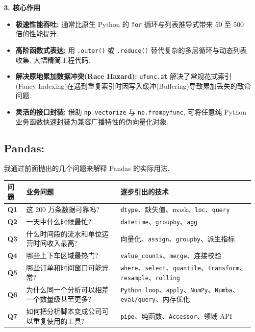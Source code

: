 \documentclass[11pt]{article}
\providecommand{\tightlist}{%
      \setlength{\itemsep}{0pt}\setlength{\parskip}{0pt}}
\begin{document}
\textbf{3. 核心作用}

\begin{itemize}
\tightlist
\item
  \textbf{极速性能吞吐:} 通常比原生 Python 的 \texttt{for}
  循环与列表推导式带来 50 至 500 倍的性能提升.
\item
  \textbf{高阶函数式表达:} 用 \texttt{.outer()} 或 \texttt{.reduce()}
  替代复杂的多层循环与动态列表收集, 大幅精简工程代码.
\item
  \textbf{解决原地累加数据冲突(Race Hazard):} \texttt{ufunc.at}
  解决了常规花式索引(Fancy
  Indexing)在遇到重复索引时因写入缓冲(Buffering)导致累加丢失的致命问题.
\item
  \textbf{灵活的接口封装:} 借助 \texttt{np.vectorize} 与
  \texttt{np.frompyfunc}, 可将任意纯 Python
  业务函数快速封装为兼容广播特性的伪向量化对象.
\end{itemize}

    \subsection{Pandas:}\label{pandas}

    我通过前面抛出的几个问题来解释 Pandas 的实际用法.

{\def\LTcaptype{none} %
\begin{longtable}[]{@{}
  >{\centering\arraybackslash}p{}
  >{\centering\arraybackslash}p{}
  >{\centering\arraybackslash}p{}@{}}
\toprule\noalign{}
\begin{minipage}[b]{\linewidth}\centering
问题
\end{minipage} & \begin{minipage}[b]{\linewidth}\centering
业务问题
\end{minipage} & \begin{minipage}[b]{\linewidth}\centering
逐步引出的技术
\end{minipage} \\
\midrule\noalign{}
\endhead
\bottomrule\noalign{}
\endlastfoot
\textbf{Q1} & 这 200 万条数据可靠吗? &
\texttt{dtype}、缺失值、mask、\texttt{loc}、\texttt{query} \\
\textbf{Q2} & 一天中什么时候最忙? &
\texttt{datetime}、\texttt{groupby}、\texttt{agg} \\
\textbf{Q3} & 什么时间段的流水和单位运营时间收入最高? &
向量化、\texttt{assign}、\texttt{groupby}、派生指标 \\
\textbf{Q4} & 哪些上下车区域最热门? &
\texttt{value\_counts}、\texttt{merge}、连接校验 \\
\textbf{Q5} & 哪些订单和时间窗口可能异常? &
\texttt{where}、\texttt{select}、\texttt{quantile}、\texttt{transform}、\texttt{resample}、\texttt{rolling} \\
\textbf{Q6} & 为什么同一个分析可以相差一个数量级甚至更多? &
\texttt{Python\ loop}、\texttt{apply}、\texttt{NumPy}、\texttt{Numba}、\texttt{eval/query}、内存优化 \\
\textbf{Q7} & 如何把分析脚本变成公司可以重复使用的工具? &
\texttt{pipe}、纯函数、\texttt{Accessor}、领域 API \\
\end{longtable}
}
\end{document}
